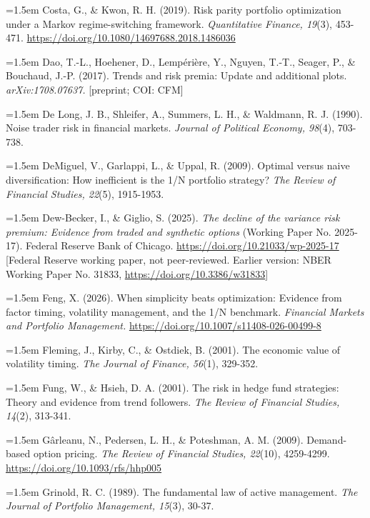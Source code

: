 \documentclass[12pt, a4paper]{article}
\begin{document}
\hangindent=1.5em
Costa, G., \& Kwon, R. H. (2019). Risk parity portfolio optimization
under a Markov regime-switching framework. \emph{Quantitative Finance,
19}(3), 453-471. \url{https://doi.org/10.1080/14697688.2018.1486036}

\hangindent=1.5em
Dao, T.-L., Hoehener, D., Lempérière, Y., Nguyen, T.-T., Seager, P., \&
Bouchaud, J.-P. (2017). Trends and risk premia: Update and additional
plots. \emph{arXiv:1708.07637.} {[}preprint; COI: CFM{]}

\hangindent=1.5em
De Long, J. B., Shleifer, A., Summers, L. H., \& Waldmann, R. J. (1990).
Noise trader risk in financial markets. \emph{Journal of Political
Economy, 98}(4), 703-738.

\hangindent=1.5em
DeMiguel, V., Garlappi, L., \& Uppal, R. (2009). Optimal versus naive
diversification: How inefficient is the 1/N portfolio strategy?
\emph{The Review of Financial Studies, 22}(5), 1915-1953.

\hangindent=1.5em
Dew-Becker, I., \& Giglio, S. (2025). \emph{The decline of the variance
risk premium: Evidence from traded and synthetic options} (Working Paper
No. 2025-17). Federal Reserve Bank of Chicago.
\url{https://doi.org/10.21033/wp-2025-17} {[}Federal Reserve working paper,
not peer-reviewed. Earlier version: NBER Working Paper No. 31833,
\url{https://doi.org/10.3386/w31833}{]}

\hangindent=1.5em
Feng, X. (2026). When simplicity beats optimization: Evidence from
factor timing, volatility management, and the 1/N benchmark.
\emph{Financial Markets and Portfolio Management.}
\url{https://doi.org/10.1007/s11408-026-00499-8}

\hangindent=1.5em
Fleming, J., Kirby, C., \& Ostdiek, B. (2001). The economic value of
volatility timing. \emph{The Journal of Finance, 56}(1), 329-352.

\hangindent=1.5em
Fung, W., \& Hsieh, D. A. (2001). The risk in hedge fund strategies:
Theory and evidence from trend followers. \emph{The Review of Financial
Studies, 14}(2), 313-341.

\hangindent=1.5em
Gârleanu, N., Pedersen, L. H., \& Poteshman, A. M. (2009). Demand-based
option pricing. \emph{The Review of Financial Studies, 22}(10),
4259-4299. \url{https://doi.org/10.1093/rfs/hhp005}

\hangindent=1.5em
Grinold, R. C. (1989). The fundamental law of active management.
\emph{The Journal of Portfolio Management, 15}(3), 30-37.
\end{document}

